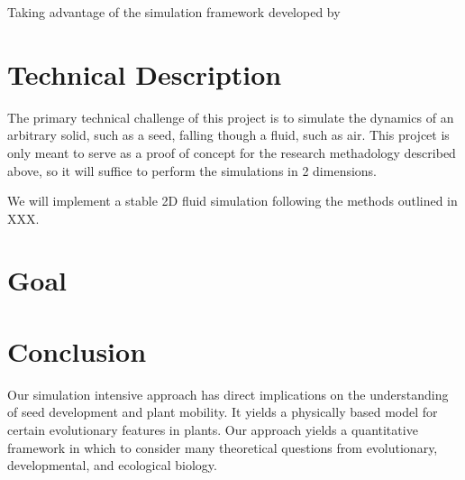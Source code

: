 \documentclass[annual]{acmsiggraph}
\begin{document}
 






Taking advantage of the simulation framework developed by 



\section{Technical Description}
The primary technical challenge of this project is to simulate the dynamics of an arbitrary solid, such as a seed, falling though a fluid, such as air.  This projcet is only meant to serve as a proof of concept for the research methadology described above, so it will suffice to perform the simulations in 2 dimensions.   

We will implement a stable 2D fluid simulation following the methods outlined in XXX.   



\section{Goal}

\section{Conclusion}

Our simulation intensive approach has direct implications on the understanding of seed development and plant mobility.  It yields a physically based model for certain evolutionary features in plants.   Our approach yields a quantitative framework in which to consider many theoretical questions from evolutionary, developmental, and ecological biology.  




\end{document}
